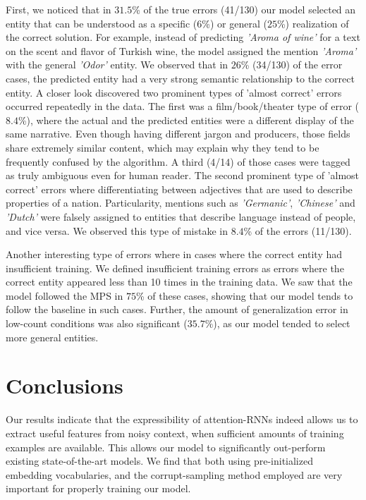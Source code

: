 \documentclass[11pt]{article}
\begin{document}
	First, we noticed that in $31.5$\% of the true errors (41/130) our model selected an entity that can be understood as a specific ($6$\%) or general ($25$\%) realization of the correct solution. For example, instead of predicting \textit{'Aroma of wine'} for a text on the scent and flavor of Turkish wine, the model assigned the mention \textit{'Aroma'} with the general \textit{'Odor'} entity. We observed that in $26$\% (34/130) of the error cases, the predicted entity had a very strong semantic relationship to the correct entity. A closer look discovered two prominent types of 'almost correct' errors occurred repeatedly in the data. The first was a film/book/theater type of error ($8.4$\%), where the actual and the predicted entities were a different display of the same narrative. Even though having different jargon and producers, those fields share extremely similar content, which may explain why they tend to be frequently confused by the algorithm. A third (4/14) of those cases were tagged as truly ambiguous even for human reader. The second prominent type of 'almost correct' errors where differentiating between adjectives that are used to describe properties of a nation. Particularity, mentions such as \textit{'Germanic'}, \textit{'Chinese'} and \textit{'Dutch'} were falsely assigned to entities that describe language instead of people, and vice versa. We observed this type of mistake in $8.4$\% of the errors (11/130).
	
	Another interesting type of errors where in cases where the correct entity had insufficient training. We defined insufficient training errors as errors where the correct entity appeared less than 10 times in the training data. We saw that the model followed the MPS in $75$\% of these cases, showing that our model tends to follow the baseline in such cases. Further, the amount of generalization error in low-count conditions was also significant ($35.7\%$), as our model tended to select more general entities.
	
	\section{Conclusions}
	Our results indicate that the expressibility of attention-RNNs indeed allows us to extract useful features from noisy context, when sufficient amounts of training examples are available. This allows our model to significantly out-perform existing state-of-the-art models. We find that both using pre-initialized embedding vocabularies, and the corrupt-sampling method employed are very important for properly training our model.
	
\end{document}
